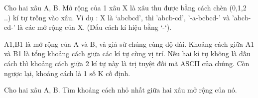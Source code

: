 Cho hai xâu A, B.  Mở rộng của 1 xâu X là xâu thu được bằng cách chèn (0,1,2 ..) kí tự trống vào xâu.  Ví dụ :  X là ‘abcbcd’, thì 'abcb-cd', '-a-bcbcd-'  và 'abcb-cd-'  là các mở rộng của X. (Dấu cách kí hiệu bằng ‘-‘).  

   A1,B1 là mở rộng của A và B, và giả sử chúng cùng độ dài. Khoảng cách giữa  A1 và B1 là tổng khoảng cách giữa các kí tự cùng vị trí. Nếu hai kí tự  không là dấu cách thì khoảng cách giữa 2 kí tự này là trị tuyệt đối mã  ASCII của chúng. Còn ngược lại, khoảng cách là 1 số K cố định.  

   Cho hai xâu A, B. Tìm khoảng cách nhỏ nhất giữa hai xâu mở rộng của nó.